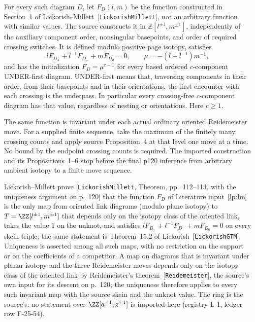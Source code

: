 \begin{literature}\label{lp:lm}\leanok\label{src:lm}
For every such diagram $D$, let $F_D(l,m)$ be the function constructed in
Section~1 of Lickorish--Millett~\textnormal{[\texttt{LickorishMillett}]}, not an arbitrary function with similar
values. The source constructs it in
$\mathbb Z[l^{\pm1},m^{\pm1}]$, independently of the auxiliary component
order, nonsingular basepoints, and order of required crossing switches.
It is defined modulo positive page isotopy, satisfies
\begin{equation}\label{lp:source-skein}
 l F_{D_+}+l^{-1} F_{D_-}+m F_{D_0}=0,
 \qquad \mu=-(l+l^{-1})m^{-1},
\end{equation}
and has the initialization $F_D=\mu^{c-1}$ for every based ordered
$c$-component UNDER-first diagram. UNDER-first means that, traversing
components in their order, from their basepoints and in their orientations,
the first encounter with each crossing is the underpass. In particular
every crossing-free $c$-component diagram has that value, regardless of
nesting or orientations. Here $c\geq1$.

The same function is invariant under each actual ordinary oriented
Reidemeister move. For a supplied finite sequence, take the maximum of the
finitely many crossing counts and apply source Proposition~4 at that level
one move at a time. No bound by the endpoint crossing counts is required.
The imported construction and its Propositions~1--6 stop before the final
p120 inference from arbitrary ambient isotopy to a finite move sequence.

\end{literature}

\begin{literature}\label{lp:lm-uniqueness}\leanok
Lickorish--Millett prove \textnormal{[\texttt{LickorishMillett}, Theorem, pp.~112--113, with the uniqueness
argument on p.~120]} that the function $F_D$ of Literature
input~\ref{lp:lm} is the only map from oriented link diagrams (modulo plane
isotopy) to $T=\ZZ[l^{\pm1},m^{\pm1}]$ that depends only on the isotopy class
of the oriented link, takes the value $1$ on the unknot, and satisfies
$lF_{D_+}+l^{-1}F_{D_-}+mF_{D_0}=0$ on every skein triple; the same statement
is Theorem~15.2 of Lickorish~\textnormal{[\texttt{LickorishGTM}]}. Uniqueness is asserted
among all such maps, with no restriction on the support or on the
coefficients of a competitor. A map on diagrams that is invariant under
planar isotopy and the three Reidemeister moves depends only on the isotopy
class of the oriented link by Reidemeister's theorem~\textnormal{[\texttt{Reidemeister}]}, the
source's own input for its descent on p.~120; the uniqueness therefore
applies to every such invariant map with the source skein and the unknot
value. The ring is the source's: no statement over $\ZZ[a^{\pm1},z^{\pm1}]$
is imported here (registry L-1, ledger row F-25-54).

\end{literature}

